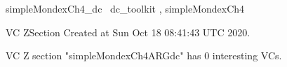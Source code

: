 \documentclass{article}
\begin{document}

\begin{zsection}	 \SECTION simpleMondexCh4\_dc \parents~dc\_toolkit , simpleMondexCh4
\end{zsection}

\newcommand{\appliesTo}{\zbinop{appliesTo}} 
\newcommand{\appliesToNofix}{\zpreop{appliesToNofix}} 

VC ZSection Created at Sun Oct 18 08:41:43 UTC 2020.



 VC Z section "simpleMondexCh4ARGdc" has $0$ interesting VCs.



\end{document}
